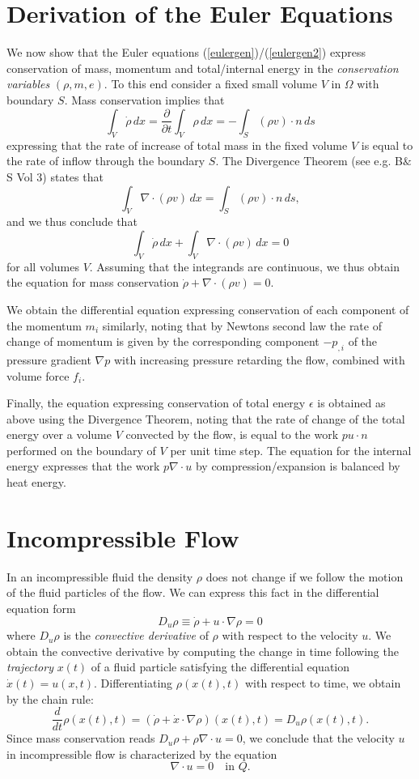 \section{Derivation of the Euler Equations}

We now show that the Euler equations (\ref{eulergen})/(\ref{eulergen2}) express conservation
of mass, momentum and total/internal energy in the \emph{conservation 
variables} $(\rho ,m,e )$. To this end consider a fixed small
volume $V$ in $\Omega$ with boundary $S$. Mass conservation implies that
\[
\int_V\dot\rho\, dx=\frac{\partial}{\partial t}\int_V\rho\, dx
=-\int_S (\rho v )\cdot n\, ds
\]
expressing that the rate of increase of total mass in the fixed volume
$V$ is equal to the rate of inflow through the boundary $S$. 
The Divergence Theorem (see e.g. B$\&$S Vol 3) states that
\[
\int_V\nabla\cdot (\rho v)\, dx=\int_S (\rho v )\cdot n\, ds,
\]
and we thus conclude that
\[
\int_V\dot\rho\, dx
+\int_V\nabla\cdot (\rho v)\, dx =0
\]
for all volumes $V$. Assuming that the integrands are continuous, we thus
obtain the equation for mass conservation $\dot\rho +\nabla\cdot (\rho v)=0$.

We obtain the differential equation expressing
conservation of each component of the momentum $m_i$
similarly, noting that by Newtons second law
the rate of change of momentum is given by the
corresponding component $-p_{,i}$ of the pressure gradient
$\nabla p$ with increasing pressure retarding the flow,
combined with volume force $f_i$. 

Finally, the 
equation expressing conservation of total energy $\epsilon$
is obtained as above using the Divergence Theorem,
noting that the rate of change of the total energy 
over a volume $V$ convected by the flow, is equal to
the work $pu\cdot n$ performed on the boundary of $V$ per unit time step.
The equation for the internal energy expresses that
the work $p\nabla\cdot u$ by compression/expansion
is balanced by heat energy. 


 
\section{Incompressible Flow}
In an incompressible fluid the density $\rho$ does not change
if we follow the motion of the fluid particles of the flow.
We can express this fact in the differential equation form
\[
D_u\rho\equiv\dot\rho +u\cdot\nabla\rho =0
\]
where $D_u\rho$ is the \emph{convective derivative} of $\rho$ with respect
to the velocity $u$.
We obtain the convective derivative by computing the change in time
following the \emph{trajectory} $x(t)$ of a fluid particle
satisfying the differential equation $\dot x(t)=u(x,t)$.
Differentiating $\rho (x(t),t)$ with respect to time, we obtain 
by the chain rule:
\[
\frac{d}{dt}\rho (x(t),t)=(\dot\rho +\dot x\cdot\nabla\rho )(x(t),t)
=D_u\rho (x(t),t).
\]
Since mass conservation reads $D_u\rho +\rho\nabla\cdot u=0$,
we conclude that the velocity $u$ in incompressible flow is characterized
by the equation
\begin{equation}\label{divu0}
\nabla\cdot u=0\quad\mbox{in }Q.
\end{equation}

